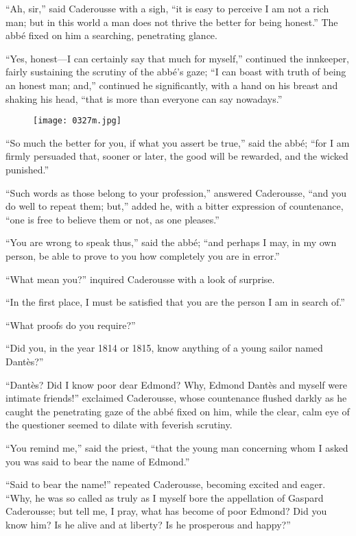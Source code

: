 “Ah, sir,” said Caderousse with a sigh, “it is easy to perceive I am
not a rich man; but in this world a man does not thrive the better for
being honest.” The abbé fixed on him a searching, penetrating glance.

“Yes, honest—I can certainly say that much for myself,” continued the
innkeeper, fairly sustaining the scrutiny of the abbé’s gaze; “I can
boast with truth of being an honest man; and,” continued he
significantly, with a hand on his breast and shaking his head, “that is
more than everyone can say nowadays.”

\begin{figure}[ht]
\texttt{[image: 0327m.jpg]}
\end{figure}

“So much the better for you, if what you assert be true,” said the
abbé; “for I am firmly persuaded that, sooner or later, the good will
be rewarded, and the wicked punished.”

“Such words as those belong to your profession,” answered Caderousse,
“and you do well to repeat them; but,” added he, with a bitter
expression of countenance, “one is free to believe them or not, as one
pleases.”

“You are wrong to speak thus,” said the abbé; “and perhaps I may, in my
own person, be able to prove to you how completely you are in error.”

“What mean you?” inquired Caderousse with a look of surprise.

“In the first place, I must be satisfied that you are the person I am
in search of.”

“What proofs do you require?”

“Did you, in the year 1814 or 1815, know anything of a young sailor
named Dantès?”

“Dantès? Did I know poor dear Edmond? Why, Edmond Dantès and myself
were intimate friends!” exclaimed Caderousse, whose countenance flushed
darkly as he caught the penetrating gaze of the abbé fixed on him,
while the clear, calm eye of the questioner seemed to dilate with
feverish scrutiny.

“You remind me,” said the priest, “that the young man concerning whom I
asked you was said to bear the name of Edmond.”

“Said to bear the name!” repeated Caderousse, becoming excited and
eager. “Why, he was so called as truly as I myself bore the appellation
of Gaspard Caderousse; but tell me, I pray, what has become of poor
Edmond? Did you know him? Is he alive and at liberty? Is he prosperous
and happy?”

